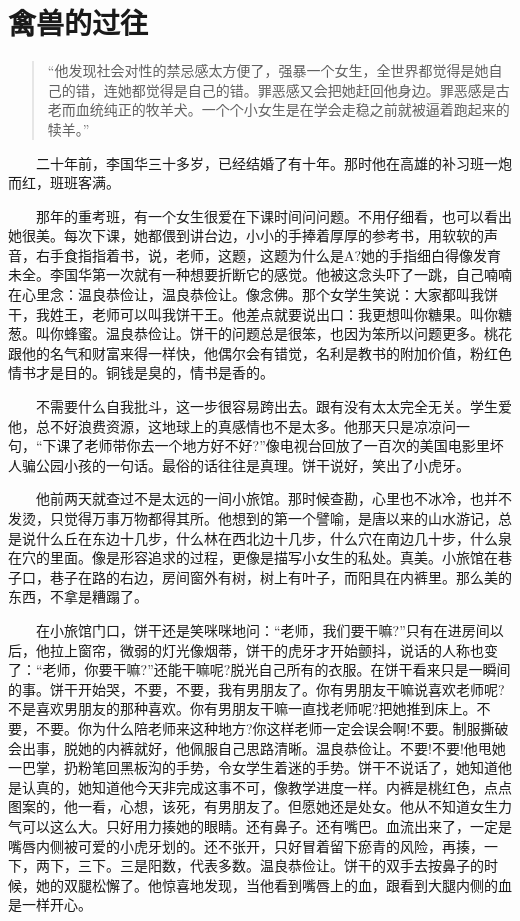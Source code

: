 \documentclass[12pt,UTF8]{ctexbook}
\begin{document}
\hypertarget{ux79bdux517dux7684ux8fc7ux5f80}{%
\section*{禽兽的过往}\label{ux79bdux517dux7684ux8fc7ux5f80}}

\begin{quote}
\enquote{他发现社会对性的禁忌感太方便了，强暴一个女生，全世界都觉得是她自己的错，连她都觉得是自己的错。罪恶感又会把她赶回他身边。罪恶感是古老而血统纯正的牧羊犬。一个个小女生是在学会走稳之前就被逼着跑起来的犊羊。}
\end{quote}

　　二十年前，李国华三十多岁，已经结婚了有十年。那时他在高雄的补习班一炮而红，班班客满。

　　那年的重考班，有一个女生很爱在下课时间问问题。不用仔细看，也可以看出她很美。每次下课，她都偎到讲台边，小小的手捧着厚厚的参考书，用软软的声音，右手食指指着书，说，老师，这题，这题为什么是A?她的手指细白得像发育未全。李国华第一次就有一种想要折断它的感觉。他被这念头吓了一跳，自己喃喃在心里念：温良恭俭让，温良恭俭让。像念佛。那个女学生笑说：大家都叫我饼干，我姓王，老师可以叫我饼干王。他差点就要说出口：我更想叫你糖果。叫你糖葱。叫你蜂蜜。温良恭俭让。饼干的问题总是很笨，也因为笨所以问题更多。桃花跟他的名气和财富来得一样快，他偶尔会有错觉，名利是教书的附加价值，粉红色情书才是目的。铜钱是臭的，情书是香的。

　　不需要什么自我批斗，这一步很容易跨出去。跟有没有太太完全无关。学生爱他，总不好浪费资源，这地球上的真感情也不是太多。他那天只是凉凉问一句，\enquote{下课了老师带你去一个地方好不好?}像电视台回放了一百次的美国电影里坏人骗公园小孩的一句话。最俗的话往往是真理。饼干说好，笑出了小虎牙。

　　他前两天就查过不是太远的一间小旅馆。那时候查勘，心里也不冰冷，也并不发烫，只觉得万事万物都得其所。他想到的第一个譬喻，是唐以来的山水游记，总是说什么丘在东边十几步，什么林在西北边十几步，什么穴在南边几十步，什么泉在穴的里面。像是形容追求的过程，更像是描写小女生的私处。真美。小旅馆在巷子口，巷子在路的右边，房间窗外有树，树上有叶子，而阳具在内裤里。那么美的东西，不拿是糟蹋了。

　　在小旅馆门口，饼干还是笑咪咪地问：\enquote{老师，我们要干嘛?}只有在进房间以后，他拉上窗帘，微弱的灯光像烟蒂，饼干的虎牙才开始颤抖，说话的人称也变了：\enquote{老师，你要干嘛?}还能干嘛呢?脱光自己所有的衣服。在饼干看来只是一瞬间的事。饼干开始哭，不要，不要，我有男朋友了。你有男朋友干嘛说喜欢老师呢?不是喜欢男朋友的那种喜欢。你有男朋友干嘛一直找老师呢?把她推到床上。不要，不要。你为什么陪老师来这种地方?你这样老师一定会误会啊!不要。制服撕破会出事，脱她的内裤就好，他佩服自己思路清晰。温良恭俭让。不要!不要!他甩她一巴掌，扔粉笔回黑板沟的手势，令女学生着迷的手势。饼干不说话了，她知道他是认真的，她知道他今天非完成这事不可，像教学进度一样。内裤是桃红色，点点图案的，他一看，心想，该死，有男朋友了。但愿她还是处女。他从不知道女生力气可以这么大。只好用力揍她的眼睛。还有鼻子。还有嘴巴。血流出来了，一定是嘴唇内侧被可爱的小虎牙划的。还不张开，只好冒着留下瘀青的风险，再揍，一下，两下，三下。三是阳数，代表多数。温良恭俭让。饼干的双手去按鼻子的时候，她的双腿松懈了。他惊喜地发现，当他看到嘴唇上的血，跟看到大腿内侧的血是一样开心。
\end{document}
